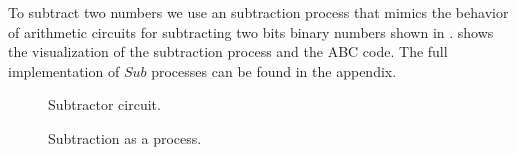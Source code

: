To subtract two numbers we use an subtraction process that mimics the behavior of arithmetic circuits for subtracting two bits binary numbers shown in 
.
 shows the visualization of the subtraction process and the ABC code.
The full implementation of $Sub$ processes can be found in the appendix.
\begin{figure}[H]%
\centering
{}
\caption{Subtractor circuit.}
\label{tra_subtract_circuit}%
\end{figure}
\begin{figure}[H]%
\centering
{}%
\hspace{1em}%
%
\vspace{2em}
%
\caption{Subtraction as a process.}
\label{tra_subttraction}%
\end{figure}

